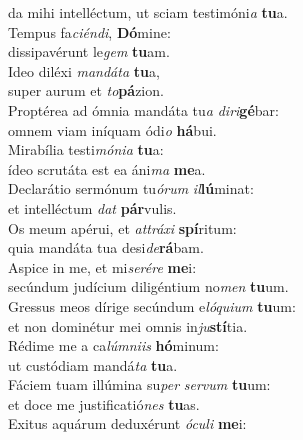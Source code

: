 \oddverse da mihi intelléctum, ut sciam testimóni\textit{a} \textbf{tu}a.\\
\evenverse Tempus fa\textit{ci}\textit{én}\textit{di}, \textbf{Dó}mine:~\*\\
\evenverse dissipavérunt le\textit{gem} \textbf{tu}am.\\
\oddverse Ideo diléxi \textit{man}\textit{dá}\textit{ta} \textbf{tu}a,~\*\\
\oddverse super aurum et \textit{to}\textbf{pá}zion.\\
\evenverse Proptérea ad ómnia mandáta tu\textit{a} \textit{di}\textit{ri}\textbf{gé}bar:~\*\\
\evenverse omnem viam iníquam ódi\textit{o} \textbf{há}bui.\\
\oddverse Mirabília testi\textit{mó}\textit{ni}\textit{a} \textbf{tu}a:~\*\\
\oddverse ídeo scrutáta est ea áni\textit{ma} \textbf{me}a.\\
\evenverse Declarátio sermónum tu\textit{ó}\textit{rum} \textit{il}\textbf{lú}minat:~\*\\
\evenverse et intelléctum \textit{dat} \textbf{pár}vulis.\\
\oddverse Os meum apérui, et \textit{at}\textit{trá}\textit{xi} \textbf{spí}ritum:~\*\\
\oddverse quia mandáta tua desi\textit{de}\textbf{rá}bam.\\
\evenverse Aspice in me, et mi\textit{se}\textit{ré}\textit{re} \textbf{me}i:~\*\\
\evenverse secúndum judícium diligéntium no\textit{men} \textbf{tu}um.\\
\oddverse Gressus meos dírige secúndum e\textit{ló}\textit{qui}\textit{um} \textbf{tu}um:~\*\\
\oddverse et non dominétur mei omnis in\textit{ju}\textbf{stí}tia.\\
\evenverse Rédime me a ca\textit{lúm}\textit{ni}\textit{is} \textbf{hó}minum:~\*\\
\evenverse ut custódiam mandá\textit{ta} \textbf{tu}a.\\
\oddverse Fáciem tuam illúmina su\textit{per} \textit{ser}\textit{vum} \textbf{tu}um:~\*\\
\oddverse et doce me justificatió\textit{nes} \textbf{tu}as.\\
\evenverse Exitus aquárum deduxérunt \textit{ó}\textit{cu}\textit{li} \textbf{me}i:~\*\\
